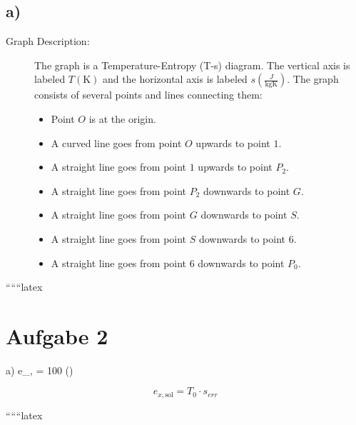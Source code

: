 

\subsection*{a)}

\begin{description}
    \item[Graph Description:] The graph is a Temperature-Entropy (T-s) diagram. The vertical axis is labeled \( T(\text{K}) \) and the horizontal axis is labeled \( s \left( \frac{J}{\text{kgK}} \right) \). The graph consists of several points and lines connecting them:
    \begin{itemize}
        \item Point \( O \) is at the origin.
        \item A curved line goes from point \( O \) upwards to point \( 1 \).
        \item A straight line goes from point \( 1 \) upwards to point \( P_2 \).
        \item A straight line goes from point \( P_2 \) downwards to point \( G \).
        \item A straight line goes from point \( G \) downwards to point \( S \).
        \item A straight line goes from point \( S \) downwards to point \( 6 \).
        \item A straight line goes from point \( 6 \) downwards to point \( P_0 \).
    \end{itemize}
\end{description}

``````latex


\section*{Aufgabe 2}

a) \quad \Delta e_{\nu, } = 100  \quad ()
\]

\[
e_{x, \text{sol}} = T_0 \cdot s_{err}
\]

``````latex